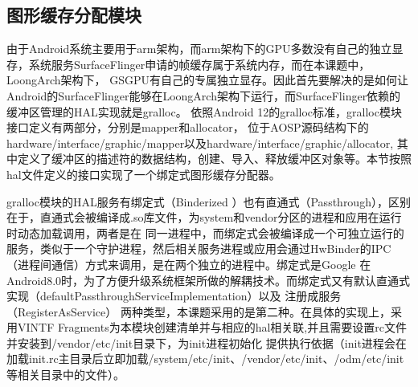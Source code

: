 







\subsection{图形缓存分配模块}
由于Android系统主要用于arm架构，而arm架构下的GPU多数没有自己的独立显存，系统服务SurfaceFlinger申请的帧缓存属于系统内存，而在本课题中，LoongArch架构下，
GSGPU有自己的专属独立显存。因此首先要解决的是如何让Android的SurfaceFlinger能够在LoongArch架构下运行，而SurfaceFlinger依赖的缓冲区管理的HAL实现就是gralloc。
依照Android 12的gralloc标准，gralloc模块接口定义有两部分，分别是mapper和allocator，
位于AOSP源码结构下的hardware/interface/graphic/mapper以及hardware/interface/graphic/allocator,
其中定义了缓冲区的描述符的数据结构，创建、导入、释放缓冲区对象等。本节按照hal文件定义的接口实现了一个绑定式图形缓存分配器。

gralloc模块的HAL服务有绑定式（Binderized ）也有直通式（Passthrough），区别在于，直通式会被编译成.so库文件，为system和vendor分区的进程和应用在运行时动态加载调用，两者是在
同一进程中，而绑定式会被编译成一个可独立运行的服务，类似于一个守护进程，然后相关服务进程或应用会通过HwBinder的IPC（进程间通信）方式来调用，是在两个独立的进程中。绑定式是Google
在Android8.0时，为了方便升级系统框架所做的解耦技术。而绑定式又有默认直通式实现（defaultPassthroughServiceImplementation）以及 注册成服务（RegisterAsService）
两种类型，本课题采用的是第二种。在具体的实现上，采用VINTF Fragments为本模块创建清单并与相应的hal相关联,并且需要设置rc文件并安装到/vendor/etc/init目录下，为init进程初始化
提供执行依据（init进程会在加载init.rc主目录后立即加载/system/etc/init、/vendor/etc/init、/odm/etc/init等相关目录中的文件）。

